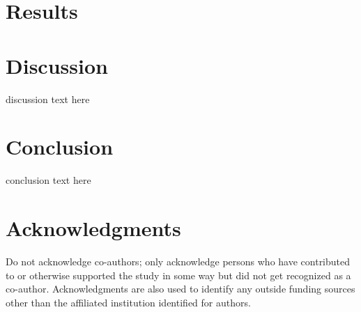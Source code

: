 \documentclass[10pt,twocolumn,twoside]{article}
\begin{document}
\section*{Results}



\section*{Discussion}
\label{secDiscussion}
discussion text here


\section*{Conclusion}
\label{secConclusion}
conclusion text here


\section*{Acknowledgments}
Do not acknowledge co-authors; only acknowledge persons who have contributed
to or otherwise supported the study in some way but did not get recognized as a co-author.
Acknowledgments are also used to identify any outside funding sources other than
the affiliated institution identified for authors.
\end{document}
